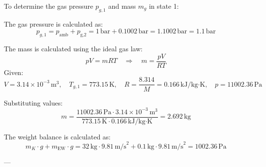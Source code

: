 To determine the gas pressure \( p_{g,1} \) and mass \( m_g \) in state 1:  

The gas pressure is calculated as:  
\[
p_{g,1} = p_{\text{amb}} + p_{\text{g,2}} = 1 \, \text{bar} + 0.1002 \, \text{bar} = 1.1002 \, \text{bar} = 1.1 \, \text{bar}
\]  

The mass is calculated using the ideal gas law:  
\[
p V = m R T \quad \Rightarrow \quad m = \frac{p V}{R T}
\]  
Given:  
\[
V = 3.14 \times 10^{-3} \, \text{m}^3, \quad T_{g,1} = 773.15 \, \text{K}, \quad R = \frac{8.314}{M} = 0.166 \, \text{kJ/kg·K}, \quad p = 11002.36 \, \text{Pa}
\]  

Substituting values:  
\[
m = \frac{11002.36 \, \text{Pa} \cdot 3.14 \times 10^{-3} \, \text{m}^3}{773.15 \, \text{K} \cdot 0.166 \, \text{kJ/kg·K}} = 2.692 \, \text{kg}
\]  

The weight balance is calculated as:  
\[
m_K \cdot g + m_{\text{EW}} \cdot g = 32 \, \text{kg} \cdot 9.81 \, \text{m/s}^2 + 0.1 \, \text{kg} \cdot 9.81 \, \text{m/s}^2 = 1002.36 \, \text{Pa}
\]  

---